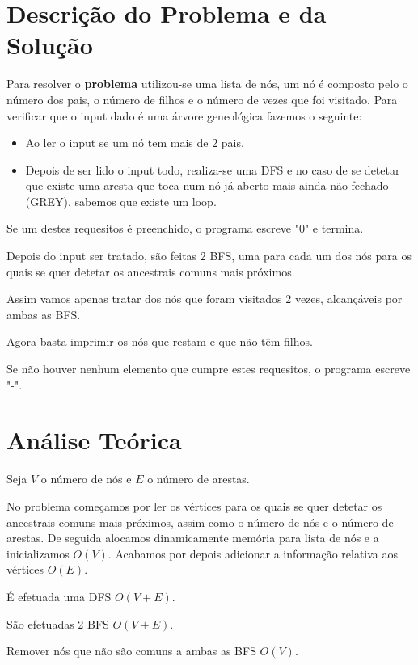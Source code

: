 \documentclass[12pt,a4paper]{article}
\begin{document}
  \section{Descrição do Problema e da Solução}

  Para resolver o \textbf{problema} utilizou-se uma lista de nós, um nó é composto pelo o número dos pais, o número de filhos e o número de vezes que foi visitado.
  Para verificar que o input dado é uma árvore geneológica fazemos o seguinte:
  \begin{itemize}
    \setlength{\itemsep}{0pt}
      \item Ao ler o input se um nó tem mais de 2 pais.
      \item Depois de ser lido o input todo, realiza-se uma DFS e no caso de se detetar que existe uma aresta que toca num nó já aberto mais ainda não fechado (GREY), sabemos que existe um loop.
  \end{itemize}

  Se um destes requesitos é preenchido, o programa escreve "0" e termina.

  Depois do input ser tratado, são feitas 2 BFS, uma para cada um dos nós para os quais se quer detetar os ancestrais comuns mais próximos.

  Assim vamos apenas tratar dos nós que foram visitados 2 vezes, alcançáveis por ambas as BFS.
  
  Agora basta imprimir os nós que restam e que não têm filhos.

  Se não houver nenhum elemento que cumpre estes requesitos, o programa escreve "-".

  \section{Análise Teórica}

  Seja $V$ o número de nós e $E$ o número de arestas.

  No problema começamos por ler os vértices para os quais se quer detetar os ancestrais comuns mais próximos, assim como o número de nós e o número de arestas.
  De seguida alocamos dinamicamente memória para lista de nós e a inicializamos $O(V)$.
  Acabamos por depois adicionar a informação relativa aos vértices $O(E)$.

  É efetuada uma DFS $O(V + E)$.

  São efetuadas 2 BFS $O(V + E)$.

  Remover nós que não são comuns a ambas as BFS $O(V)$.
\end{document}
